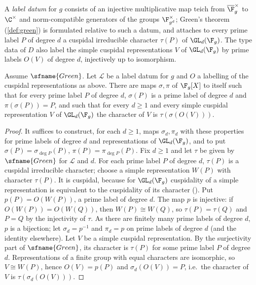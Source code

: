 A \emph{label datum} for $g$ consists of an injective multiplicative map $\mathrm{teich}$ from
$\overline\F_g^\times$ to $\C^\times$ and norm-compatible generators of the groups $\F_{g^d}^\times$; Green's
theorem (\cref{def:green}) is formulated relative to such a datum, and attaches to every prime label $P$ of
degree $d$ a cuspidal irreducible character $\tau(P)$ of $\GL_d(\F_g)$. The type data of $D$ also label the
simple cuspidal representations $V$ of $\GL_d(\F_g)$ by prime labels $O(V)$ of degree $d$, injectively up to
isomorphism.

\begin{lemma}\label{pf:top-shape:perm}
Assume $\sfname{Green}$. Let $\mathcal L$ be a label datum for $g$ and $O$ a labelling of the cuspidal
representations as above. There are maps $\sigma,\pi$ of $\F_g[X]$ to itself such that for every prime label $P$
of degree $d$, $\sigma(P)$ is a prime label of degree $d$ and $\pi(\sigma(P))=P$, and such that for every $d\ge1$
and every simple cuspidal representation $V$ of $\GL_d(\F_g)$ the character of $V$ is $\tau(\sigma(O(V)))$.
\end{lemma}

\begin{proof}
It suffices to construct, for each $d\ge1$, maps $\sigma_d,\pi_d$ with these properties for prime labels of
degree $d$ and representations of $\GL_d(\F_g)$, and to put $\sigma(P)=\sigma_{\deg P}(P)$,
$\pi(P)=\pi_{\deg P}(P)$. Fix $d\ge1$ and let $\tau$ be given by $\sfname{Green}$ for $\mathcal L$ and $d$. For each
prime label $P$ of degree $d$, $\tau(P)$ is a cuspidal irreducible character; choose a simple representation
$W(P)$ with character $\tau(P)$. It is cuspidal, because for $\GL_d(\F_g)$ cuspidality of a simple
representation is equivalent to the cuspidality of its character
(). Put $p(P)=O(W(P))$, a prime label of
degree $d$. The map $p$ is injective: if $O(W(P))=O(W(Q))$, then $W(P)\cong W(Q)$, so $\tau(P)=\tau(Q)$ and $P=Q$ by
the injectivity of $\tau$. As there are finitely many prime labels of degree $d$, $p$ is a bijection; let
$\sigma_d=p^{-1}$ and $\pi_d=p$ on prime labels of degree $d$ (and the identity elsewhere). Let $V$ be a simple
cuspidal representation. By the surjectivity part of $\sfname{Green}$, its character is $\tau(P)$ for some prime
label $P$ of degree $d$. Representations of a finite group with equal characters are isomorphic, so $V\cong
W(P)$, hence $O(V)=p(P)$ and $\sigma_d(O(V))=P$, i.e.\ the character of $V$ is $\tau(\sigma_d(O(V)))$.
\end{proof}

